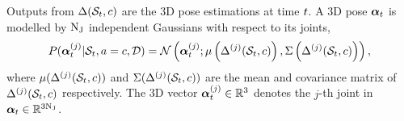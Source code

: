 Outputs from $\Delta(\mathcal{S}_{t}, c)$ are the 3D pose estimations at time $t$. A 3D pose $\boldsymbol{\alpha}_{t}$ is modelled by $\mathrm{N_{J}}$ independent Gaussians with respect to its joints,  
\begin{equation} 
	\label{eqn/body/adgaussian}
	P( \boldsymbol{\alpha}^{(j)}_{t}| \mathcal{S}_{t}, a = c,\mathcal{D}) =
	\mathcal{N}\left(\boldsymbol{\alpha}^{(j)}_{t}; \mu\left(\Delta^{(j)}(\mathcal{S}_{t},c)\right), \Sigma\left(\Delta^{(j)}(\mathcal{S}_{t},c)\right)\right),
\end{equation}
where $\mu(\Delta^{(j)}(\mathcal{S}_{t},c))$ and $\Sigma(\Delta^{(j)}(\mathcal{S}_{t},c))$ are the mean and covariance matrix of $\Delta^{(j)}(\mathcal{S}_{t},c)$ respectively.  The 3D vector $\boldsymbol{\alpha}_{t}^{(j)}\in\mathbb{R}^{3}$ denotes the $j$-th joint in $\boldsymbol{\alpha}_{t}\in\mathbb{R}^{3\mathrm{N_{J}}}$.

